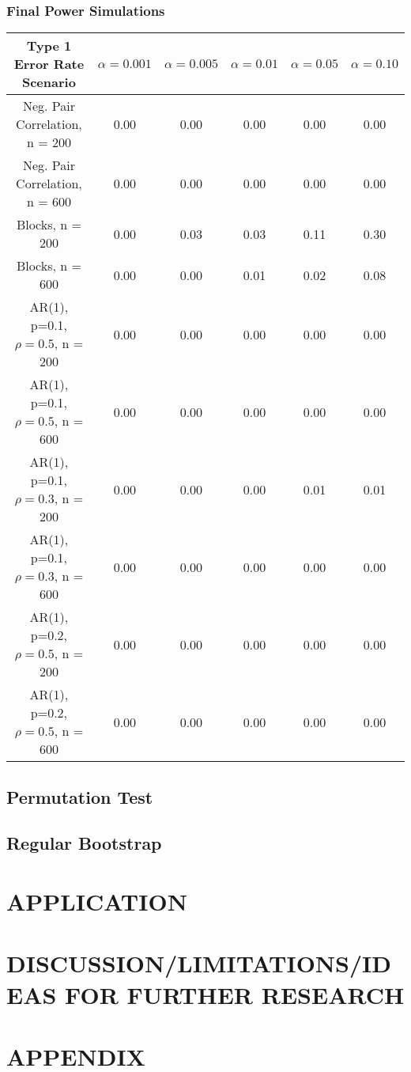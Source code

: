 \documentclass[12pt, letterpaper]{article}
\begin{document}
\subsubsection{Final Power Simulations}
\begin{tabular}{|c|c|c|c|c|c|}
\hline
\textbf{Type 1 Error Rate Scenario} & $\alpha = 0.001$ &  $\alpha = 0.005$ &  $\alpha = 0.01$ &  $\alpha = 0.05$ &  $\alpha = 0.10$ \\
\hline
Neg. Pair Correlation, n = 200 & 0.00 & 0.00 & 0.00 & 0.00 & 0.00 \\
\hline
Neg. Pair Correlation, n = 600 & 0.00 & 0.00 & 0.00 & 0.00 & 0.00 \\
\hline
Blocks, n = 200 & 0.00 & 0.03 & 0.03 & 0.11 & 0.30 \\
\hline
Blocks, n = 600 & 0.00 & 0.00 & 0.01 & 0.02 & 0.08 \\
\hline
AR(1), p=0.1, $\rho = 0.5$, n = 200 & 0.00 & 0.00 & 0.00 & 0.00 & 0.00 \\
\hline
AR(1), p=0.1, $\rho = 0.5$, n = 600 & 0.00 & 0.00 & 0.00 & 0.00 & 0.00 \\
\hline
AR(1), p=0.1, $\rho = 0.3$, n = 200 & 0.00 & 0.00 & 0.00 & 0.01 & 0.01 \\
\hline
AR(1), p=0.1, $\rho = 0.3$, n = 600 & 0.00 & 0.00 & 0.00 & 0.00 & 0.00 \\
\hline
AR(1), p=0.2, $\rho = 0.5$, n = 200 & 0.00 & 0.00 & 0.00 & 0.00 & 0.00 \\
\hline
AR(1), p=0.2, $\rho = 0.5$, n = 600 & 0.00 & 0.00 & 0.00 & 0.00 & 0.00 \\
\hline
\end{tabular}

\subsection{Permutation Test}
\subsection{Regular Bootstrap}


\section{APPLICATION}


\section{DISCUSSION/LIMITATIONS/IDEAS FOR FURTHER RESEARCH}


\section{APPENDIX}
\end{document}
